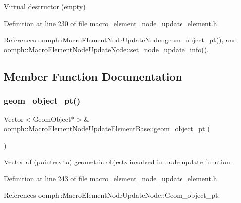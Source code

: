 Virtual destructor (empty) 



Definition at line 230 of file macro\+\_\+element\+\_\+node\+\_\+update\+\_\+element.\+h.



References oomph\+::\+Macro\+Element\+Node\+Update\+Node\+::geom\+\_\+object\+\_\+pt(), and oomph\+::\+Macro\+Element\+Node\+Update\+Node\+::set\+\_\+node\+\_\+update\+\_\+info().



\subsection{Member Function Documentation}
\mbox{\label{classoomph_1_1MacroElementNodeUpdateElementBase_a45d0d15ee371799c84f59bb13cdac304}} 
\subsubsection{\texorpdfstring{geom\+\_\+object\+\_\+pt()}{geom\_object\_pt()}\hspace{0.1cm}{\footnotesize\ttfamily [1/2]}}
{\footnotesize\ttfamily \hyperlink{classoomph_1_1Vector}{Vector}$<$\hyperlink{classoomph_1_1GeomObject}{Geom\+Object}$\ast$$>$\& oomph\+::\+Macro\+Element\+Node\+Update\+Element\+Base\+::geom\+\_\+object\+\_\+pt (\begin{DoxyParamCaption}{ }\end{DoxyParamCaption})\hspace{0.3cm}{\ttfamily [inline]}}



\hyperlink{classoomph_1_1Vector}{Vector} of (pointers to) geometric objects involved in node update function. 



Definition at line 243 of file macro\+\_\+element\+\_\+node\+\_\+update\+\_\+element.\+h.



References oomph\+::\+Macro\+Element\+Node\+Update\+Node\+::\+Geom\+\_\+object\+\_\+pt.



